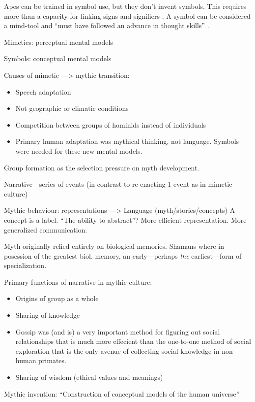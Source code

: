 \documentclass{article}
\begin{document}
Apes can be trained in symbol use, but they don't invent symbols. This requires more than a capacity for linking signs and signifiers \citep[p.~217-220]{donald1991}. A symbol can be considered a mind-tool \citep{gregory1981} and ``must have followed an advance in thought skills'' \citep[p.219]{donald1991}.

Mimetics: perceptual mental models

Symbols: conceptual mental models

Causes of mimetic ---> mythic transition:
\begin{itemize}
  \item Speech adaptation
  \item Not geographic or climatic conditions
  \item Competition between groups of hominids instead of individuals %
  \item Primary human adaptation was mythical thinking, not language. Symbols were needed for these new mental models.
\end{itemize}

Group formation as the selection pressure on myth development.

Narrative---series of events (in contrast to re-enacting 1 event as in mimetic culture)

Mythic behaviour: representations ---> Language (myth/stories/concepts) A concept is a label.
“The ability to abstract”?
More efficient representation.
More generalized communication.

Myth originally relied entirely on biological memories. Shamans where in posession of the greatest biol. memory, an early---perhaps \emph{the} earliest---form of specialization.

Primary functions of narrative in mythic culture: 
\begin{itemize}
  \item Origins of group as a whole
  \item Sharing of knowledge
  \item Gossip was (and is) a very important method for figuring out social relationships that is much more effecient than the one-to-one method of social exploration that is the only avenue of collecting social knowledge in non-human primates.
  \item Sharing of wisdom (ethical values and meanings)
\end{itemize}
Mythic invention: “Construction of conceptual models of the human universe”
\end{document}
